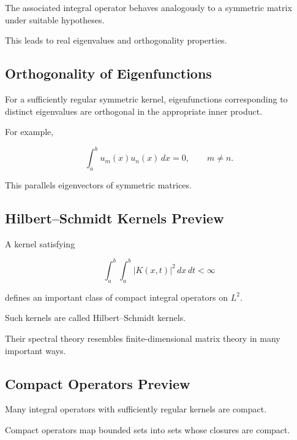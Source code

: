 The associated integral operator behaves analogously to a symmetric
matrix under suitable hypotheses.

This leads to real eigenvalues and orthogonality properties.

\subsection{Orthogonality of Eigenfunctions}
\label{subsec:integral-eigenfunction-orthogonality}

For a sufficiently regular symmetric kernel, eigenfunctions corresponding
to distinct eigenvalues are orthogonal in the appropriate inner product.

For example,

\[
\boxed{
\int_a^b
u_m(x)u_n(x)\,dx
=
0,
\qquad
m\neq n.
}
\]

This parallels eigenvectors of symmetric matrices.

\subsection{Hilbert--Schmidt Kernels Preview}
\label{subsec:hilbert-schmidt-kernels-preview}

A kernel satisfying

\[
\boxed{
\int_a^b
\int_a^b
|K(x,t)|^2
\,dx\,dt
<
\infty
}
\]

defines an important class of compact integral operators on \(L^2\).

Such kernels are called Hilbert--Schmidt kernels.

Their spectral theory resembles finite-dimensional matrix theory in many
important ways.

\subsection{Compact Operators Preview}
\label{subsec:compact-integral-operators-preview}

Many integral operators with sufficiently regular kernels are compact.

Compact operators map bounded sets into sets whose closures are compact.

